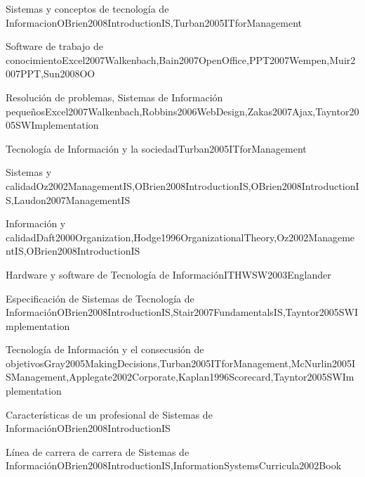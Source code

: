 \begin{LU1}{Sistemas y conceptos de tecnología de Informacion}{OBrien2008IntroductionIS,Turban2005ITforManagement}{}
\begin{LU2}{Software de trabajo de conocimiento}{Excel2007Walkenbach,Bain2007OpenOffice,PPT2007Wempen,Muir2007PPT,Sun2008OO}{}
\begin{LU3}{Resolución de problemas, Sistemas de Información pequeños}{Excel2007Walkenbach,Robbins2006WebDesign,Zakas2007Ajax,Tayntor2005SWImplementation}{}
\begin{LU4}{Tecnología de Información y la sociedad}{Turban2005ITforManagement}{}
\begin{LU5}{Sistemas y calidad}{Oz2002ManagementIS,OBrien2008IntroductionIS,OBrien2008IntroductionIS,Laudon2007ManagementIS}{}
\begin{LU6}{Información y calidad}{Daft2000Organization,Hodge1996OrganizationalTheory,Oz2002ManagementIS,OBrien2008IntroductionIS}{}
\begin{LU7}{Hardware y software de Tecnología de Información}{ITHWSW2003Englander}{}
\begin{LU8}{Especificación de Sistemas de Tecnología de Información}{OBrien2008IntroductionIS,Stair2007FundamentalsIS,Tayntor2005SWImplementation}{}
\begin{LU9}{Tecnología de Información y el consecusión de objetivos}{Gray2005MakingDecisions,Turban2005ITforManagement,McNurlin2005ISManagement,Applegate2002Corporate,Kaplan1996Scorecard,Tayntor2005SWImplementation}{}
\begin{LU10}{Características de un profesional de Sistemas de Información}{OBrien2008IntroductionIS}{}
\begin{LU11}{Línea de carrera de carrera de Sistemas de Información}{OBrien2008IntroductionIS,InformationSystemsCurricula2002Book}{}
\end{LU11}
\end{LU10}
\end{LU9}
\end{LU8}
\end{LU7}
\end{LU6}
\end{LU5}
\end{LU4}
\end{LU3}
\end{LU2}
\end{LU1}
